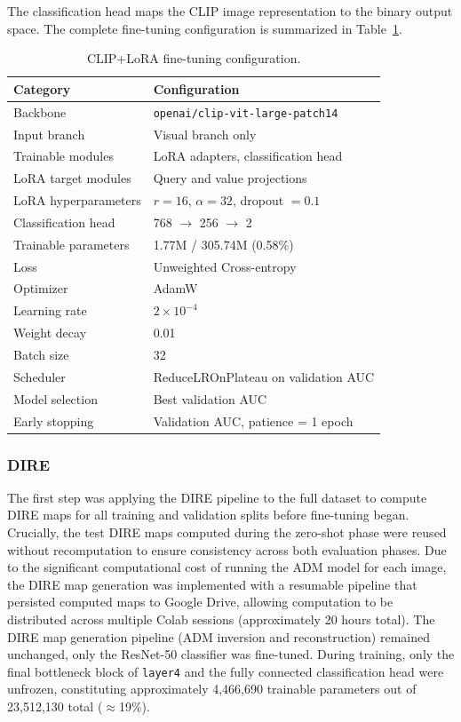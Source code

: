 The classification head maps the CLIP image representation to the binary output space. The complete fine-tuning configuration is summarized in Table~\ref{tab:clip_lora_config}.

\begin{table}[h]
\centering
\caption{CLIP+LoRA fine-tuning configuration.}
\label{tab:clip_lora_config}
\begin{tabular}{ll}
\hline
\textbf{Category} & \textbf{Configuration} \\
\hline
Backbone & \texttt{openai/clip-vit-large-patch14} \\
Input branch & Visual branch only \\
Trainable modules & LoRA adapters, classification head \\
LoRA target modules & Query and value projections \\
LoRA hyperparameters & $r=16$, $\alpha=32$, dropout $=0.1$ \\
Classification head & 768 $\rightarrow$ 256 $\rightarrow$ 2 \\
Trainable parameters & 1.77M / 305.74M (0.58\%) \\
Loss & Unweighted Cross-entropy \\
Optimizer & AdamW \\
Learning rate & $2 \times 10^{-4}$ \\
Weight decay & 0.01 \\
Batch size & 32 \\
Scheduler & ReduceLROnPlateau on validation AUC \\
Model selection & Best validation AUC \\
Early stopping & Validation AUC, patience = 1 epoch \\
\hline
\end{tabular}
\end{table}


\subsubsection{DIRE}
\label{subsubsec:dire-ft}
The first step was applying the DIRE pipeline to the full dataset to compute DIRE maps for all training and validation splits before fine-tuning began. Crucially, the test DIRE maps computed during the zero-shot phase were reused without recomputation to ensure consistency across both evaluation phases.
Due to the significant computational cost of running the ADM model for each image, the DIRE map generation was implemented with a resumable pipeline that persisted computed maps to Google Drive, allowing computation to be distributed across multiple Colab sessions (approximately 20 hours total).
The DIRE map generation pipeline (ADM inversion and reconstruction) remained unchanged, only the ResNet-50 classifier was fine-tuned. During training, only the final bottleneck block of \texttt{layer4} and the fully connected classification head were unfrozen, constituting approximately 4,466,690 trainable parameters out of 23,512,130 total ($\approx$19\%).

